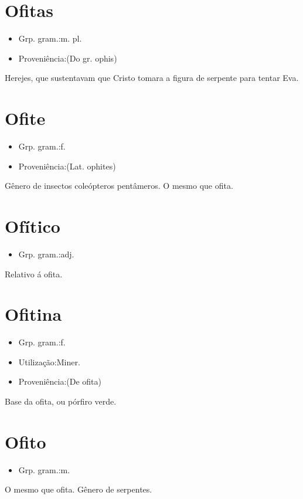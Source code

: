 \section{Ofitas}
\begin{itemize}
\item {Grp. gram.:m. pl.}
\end{itemize}
\begin{itemize}
\item {Proveniência:(Do gr. \textunderscore ophis\textunderscore )}
\end{itemize}
Herejes, que sustentavam que Cristo tomara a figura de serpente para tentar Eva.
\section{Ofite}
\begin{itemize}
\item {Grp. gram.:f.}
\end{itemize}
\begin{itemize}
\item {Proveniência:(Lat. \textunderscore ophites\textunderscore )}
\end{itemize}
Gênero de insectos coleópteros pentâmeros.
O mesmo que \textunderscore ofita\textunderscore .
\section{Ofítico}
\begin{itemize}
\item {Grp. gram.:adj.}
\end{itemize}
Relativo á ofita.
\section{Ofitina}
\begin{itemize}
\item {Grp. gram.:f.}
\end{itemize}
\begin{itemize}
\item {Utilização:Miner.}
\end{itemize}
\begin{itemize}
\item {Proveniência:(De \textunderscore ofita\textunderscore )}
\end{itemize}
Base da ofita, ou pórfiro verde.
\section{Ofito}
\begin{itemize}
\item {Grp. gram.:m.}
\end{itemize}
O mesmo que \textunderscore ofita\textunderscore .
Gênero de serpentes.
